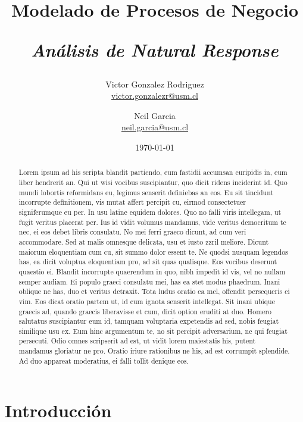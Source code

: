 \documentclass[12pt,letterpaper]{article}
\begin{document}
\begin{titlepage}
\title{Modelado de Procesos de Negocio \\ \begin{Large}\it Análisis de Natural Response\end{Large}} 
\author{Victor Gonzalez Rodriguez\\\url{victor.gonzalezr@usm.cl} \\
\and Neil Garcia\\\url{neil.garcia@usm.cl}}
\date{\today}
\maketitle
\begin{abstract}
Lorem ipsum ad his scripta blandit partiendo, eum fastidii accumsan euripidis in, eum liber hendrerit an. Qui ut wisi vocibus suscipiantur, quo dicit ridens inciderint id. Quo mundi lobortis reformidans eu, legimus senserit definiebas an eos. Eu sit tincidunt incorrupte definitionem, vis mutat affert percipit cu, eirmod consectetuer signiferumque eu per. In usu latine equidem dolores. Quo no falli viris intellegam, ut fugit veritus placerat per. Ius id vidit volumus mandamus, vide veritus democritum te nec, ei eos debet libris consulatu. No mei ferri graeco dicunt, ad cum veri accommodare. Sed at malis omnesque delicata, usu et iusto zzril meliore. Dicunt maiorum eloquentiam cum cu, sit summo dolor essent te. Ne quodsi nusquam legendos has, ea dicit voluptua eloquentiam pro, ad sit quas qualisque. Eos vocibus deserunt quaestio ei. Blandit incorrupte quaerendum in quo, nibh impedit id vis, vel no nullam semper audiam. Ei populo graeci consulatu mei, has ea stet modus phaedrum. Inani oblique ne has, duo et veritus detraxit. Tota ludus oratio ea mel, offendit persequeris ei vim. Eos dicat oratio partem ut, id cum ignota senserit intellegat. Sit inani ubique graecis ad, quando graecis liberavisse et cum, dicit option eruditi at duo. Homero salutatus suscipiantur eum id, tamquam voluptaria expetendis ad sed, nobis feugiat similique usu ex. Eum hinc argumentum te, no sit percipit adversarium, ne qui feugiat persecuti. Odio omnes scripserit ad est, ut vidit lorem maiestatis his, putent mandamus gloriatur ne pro. Oratio iriure rationibus ne his, ad est corrumpit splendide. Ad duo appareat moderatius, ei falli tollit denique eos.
\end{abstract}
\end{titlepage}
\newpage
\tableofcontents

\section{Introducción}
\end{document}

